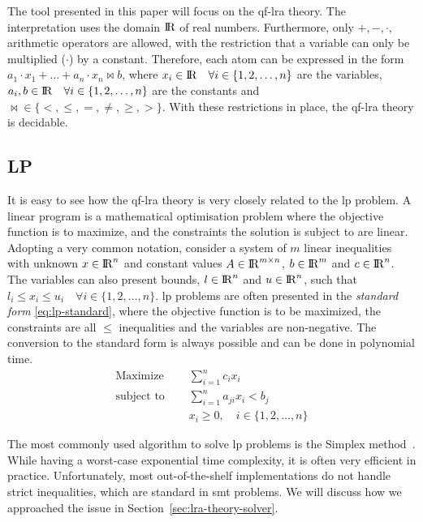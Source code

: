 \documentclass[runningheads]{llncs}
\begin{document}
The tool presented in this paper will focus on the \gls{qf-lra} theory.
The interpretation uses the domain ${\rm I\!R}$ of real numbers.
Furthermore, only $+, -, \cdot,$ arithmetic operators are allowed, with the restriction that a variable can only be multiplied ($\cdot$) by a constant.
Therefore, each atom can be expressed in the form $a_1 \cdot x_1 + \ldots + a_n \cdot  x_n \bowtie b$, where $x_i \in {\rm I\!R} \quad \forall i \in \{1, 2, \dots, n\}$ are the variables, $a_i, b \in {\rm I\!R} \quad \forall i \in \{1, 2, \dots, n\}$ are the constants and $\bowtie \in \{<, \le, =, \ne, \ge, >\}$.
With these restrictions in place, the \gls{qf-lra} theory is decidable.

\subsection{LP}
\label{sec:lp}

It is easy to see how the \gls{qf-lra} theory is very closely related to the \gls{lp} problem.
A linear program is a mathematical optimisation problem where the objective function is to maximize, and the constraints the solution is subject to are linear.
Adopting a very common notation, consider a system of $m$ linear inequalities with unknown $x \in {\rm I\!R}^n$ and constant values $A \in {\rm I\!R}^{m \times n}$, $b \in {\rm I\!R}^m$ and $c \in {\rm I\!R}^n$.
The variables can also present bounds, $l \in {\rm I\!R}^n$ and $u \in {\rm I\!R}^n$, such that $l_i \le x_i \le u_i \quad \forall i \in \{1, 2, \ldots, n\}$.
\gls{lp} problems are often presented in the \textit{standard form} \eqref{eq:lp-standard}, where the objective function is to be maximized, the constraints are all $\le$ inequalities and the variables are non-negative.
The conversion to the standard form is always possible and can be done in polynomial time.
\begin{equation}
    \label{eq:lp-standard}
    \begin{split}
        \text{Maximize }   \quad & \sum_{i=1}^{n} c_i x_i                      \\
        \text{subject to } \quad & \sum_{i=1}^{n} a_{ji}x_{i} < b_j            \\
        & x_i \ge 0,  \quad i \in \{1, 2, \ldots, n\}
    \end{split}
\end{equation}

The most commonly used algorithm to solve \gls{lp} problems is the Simplex method~\cite{ref:simplex}.
While having a worst-case exponential time complexity, it is often very efficient in practice.
Unfortunately, most out-of-the-shelf implementations do not handle strict inequalities, which are standard in \gls{smt} problems.
We will discuss how we approached the issue in Section~\ref{sec:lra-theory-solver}.
\end{document}
